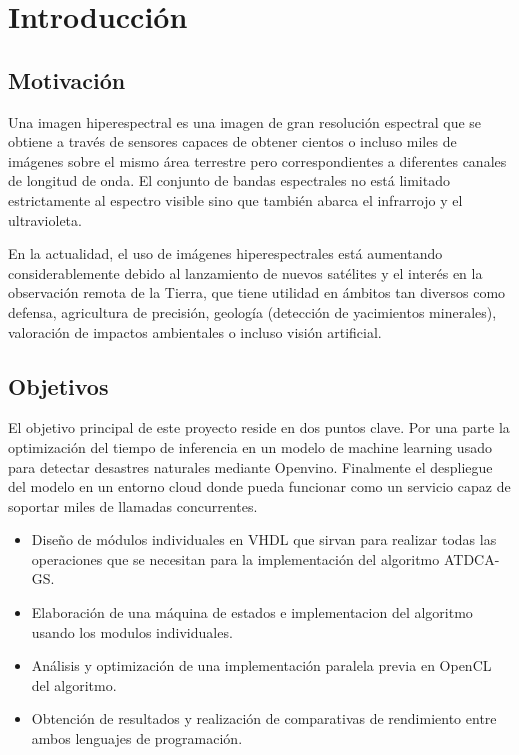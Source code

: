 \cleardoublepage


\chapter{Introducción}
\label{ch:chapter1}


\section{Motivación}

Una imagen hiperespectral es una imagen de gran resolución espectral que se obtiene a través de sensores capaces de obtener cientos o incluso miles de imágenes sobre el mismo área terrestre
pero correspondientes a diferentes canales de longitud de onda.
El conjunto de bandas espectrales no está limitado estrictamente al espectro visible sino que también abarca el infrarrojo y el ultravioleta.

En la actualidad, el uso de imágenes hiperespectrales está aumentando considerablemente debido al lanzamiento de nuevos satélites y el interés en la observación remota de la Tierra,
que tiene utilidad en ámbitos tan diversos como defensa, agricultura de precisión, geología (detección de yacimientos minerales), valoración de impactos ambientales o incluso visión artificial.

\section{Objetivos}

El objetivo principal de este proyecto reside en dos puntos clave.
Por una parte la optimización del tiempo de inferencia en un modelo de machine learning usado para detectar desastres naturales mediante Openvino.
Finalmente el despliegue del modelo en un entorno cloud donde pueda funcionar como un servicio capaz de soportar miles de llamadas concurrentes.

\begin{itemize}
    \item Diseño de módulos individuales en VHDL que sirvan para realizar todas las operaciones que se necesitan para la implementación del algoritmo ATDCA-GS.
    \item Elaboración de una máquina de estados e implementacion del algoritmo usando los modulos individuales.
    \item Análisis y optimización de una implementación paralela previa en OpenCL del algoritmo.
    \item Obtención de resultados y realización de comparativas de rendimiento entre ambos lenguajes de programación.
\end{itemize}

